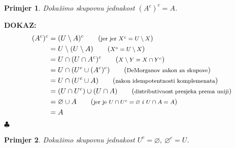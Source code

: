 \documentclass{article}
\newtheorem{primjer}{Primjer}
\newenvironment{dokaz}
    {\noindent\textbf{DOKAZ:}\\} {\hfill $\clubsuit$}
\begin{document}
\vskip 1cm

\begin{primjer}
    Dokažimo skupovnu jednakost $(A^c)^c=A$.
\end{primjer}

\begin{dokaz}
    \begin{align*}
        (A^c)^c &= (U\setminus A)^c                 \tag{\textrm{\footnotesize jer jer $X^c=U\setminus X$}}\\
                &= U\setminus (U\setminus A)        \tag{\textrm{\footnotesize $X^c=U\setminus X$}}\\
                &= U\cap (U\cap A^c)^c              \tag{\textrm{\footnotesize $X\setminus Y=X\cap Y^c$}}\\
                &= U\cap (U^c\cup (A^c)^c)          \tag{\textrm{\footnotesize DeMorganov zakon za skupove}}\\
                &= U\cap (U^c\cup A)                \tag{\textrm{\footnotesize zakon idempotentnosti komplemenata}}\\
                &= (U\cap U^c)\cup (U\cap A)        \tag{\textrm{\footnotesize distributivnost presjeka prema uniji}}\\
                &= \varnothing\cup A                \tag{\textrm{\footnotesize jer je $U\cap U^c = \varnothing\ i\ U\cap A=A$}}\\
                &= A
    \end{align*}
\end{dokaz}

\newpage
\begin{primjer}
    Dokažimo skupovnu jednakost $U^c=\varnothing,\ \varnothing ^c=U$.
\end{primjer}
\end{document}
